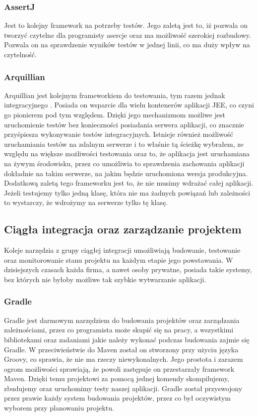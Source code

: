 \subsubsection{AssertJ}
Jest to kolejny framework na potrzeby testów. Jego zaletą jest to, iż pozwala on tworzyć czytelne dla programisty asercje oraz ma możliwość szerokiej rozbudowy. Pozwala on na sprawdzenie wyników testów w jednej linii, co ma duży wpływ na czytelność.

\subsubsection{Arquillian}
Arquillian jest kolejnym frameworkiem do testowania, tym razem jednak integracyjnego \cite{ARQ}. Posiada on wsparcie dla wielu kontenerów aplikacji JEE, co czyni go pionierem pod tym względem. Dzięki jego mechanizmom możliwe jest uruchomienie testów bez konieczności posiadania serwera aplikacji, co znacznie przyśpiesza wykonywanie testów integracyjnych. Istnieje również możliwość uruchamiania testów na zdalnym serwerze i to właśnie tą ścieżkę wybrałem, ze względu na większe możliwości testowania oraz to, że aplikacja jest uruchamiana na żywym środowisku, przez co umożliwia to sprawdzenia zachowania aplikacji dokładnie na takim serwerze, na jakim będzie uruchomiona wersja produkcyjna. Dodatkową zaletą tego frameworku jest to, że nie musimy wdrażać całej aplikacji. Jeżeli testujemy tylko jedną klasę, która nie ma żadnych powiązań lub zależności to wystarczy, że wdrożymy na serwerze tylko tę klasę.

\subsection{Ciągła integracja oraz zarządzanie projektem}
Koleje narzędzia z grupy ciągłej integracji umożliwiają budowanie, testowanie oraz monitorowanie stanu projektu na każdym etapie jego powstawania. W dzisiejszych czasach każda firma, a nawet osoby prywatne, posiada takie systemy, bez których nie byłoby możliwe tak szybkie wytwarzanie aplikacji.

\subsubsection{Gradle}
Gradle jest darmowym narzędziem do budowania projektów oraz zarządzania zależnościami, przez co programista może skupić się na pracy, a wszystkimi bibliotekami oraz zadaniami jakie należy wykonać podczas budowania zajmie się Gradle. W przeciwieństwie do Maven został on stworzony przy użyciu języka Groovy, co sprawia, że nie ma rzeczy niewykonalnych. Jego prostota i zarazem ogrom możliwości sprawiają, że powoli zastępuje on przestarzały framework Maven. Dzięki temu projektowi za pomocą jednej komendy skompilujemy, zbudujemy oraz uruchomimy testy naszej aplikacji. Gradle został przyswojony przez prawie każdy system budowania projektów, przez co był oczywistym wyborem przy planowaniu projektu.

